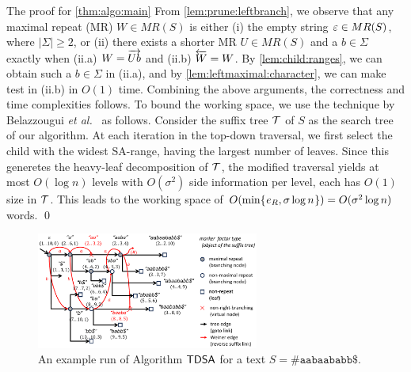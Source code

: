 \begin{statement}{The proof for \cref{thm:algo:main}}
  From \cref{lem:prune:leftbranch}, we observe that any maximal repeat (MR) $W \in MR(S)$ is either (i) the empty string $\varepsilon \in MR(S)$, where $|\Sigma|\ge 2$, or (ii) there exists a shorter MR $U \in MR(S)$ and a $b \in \Sigma$ exactly when (ii.a) $W = \overrightarrow{Ub}$ and (ii.b) $\overleftarrow{W} = W$.
  By \cref{lem:child:ranges}, we can obtain such a $b \in \Sigma$ in (ii.a), and by \cref{lem:leftmaximal:character}, we can make test in (ii.b) in $O(1)$ time. 
  Combining the above arguments, the correctness and time complexities follows. 
  To bound the working space, we use the technique by Belazzougui \textit{et al.}~\cite[Lemma~4.2]{belazzougui2020linear} as follows. Consider the suffix tree $\mathcal{T}$ of $S$ as the search tree of our algorithm. At each iteration in the top-down traversal, we first select the child with the widest SA-range, having the largest number of leaves. Since this generetes the heavy-leaf decomposition of $\mathcal{T}$, the modified traversal yields at most $O(\log n)$ levels with $O(\sigma^2)$ side information per level, each has $O(1)$ size in $\mathcal{T}$. This leads to the working space of $O(\min\{\kern0.05eme_R, \sigma\log n\kern0.05em\}) = O(\sigma^2\log n)$ words. \qed 
\end{statement}

\begin{figure}[t]
\centering  
  \includegraphics[width=0.65\textwidth]{fig/exp1/fig2.pdf}
  \caption{An example run of Algorithm $\textsf{TDSA}$ for a text $S = \mathtt{\#aabaababb\$}$.
}\label{fig:run:example}
\end{figure}


